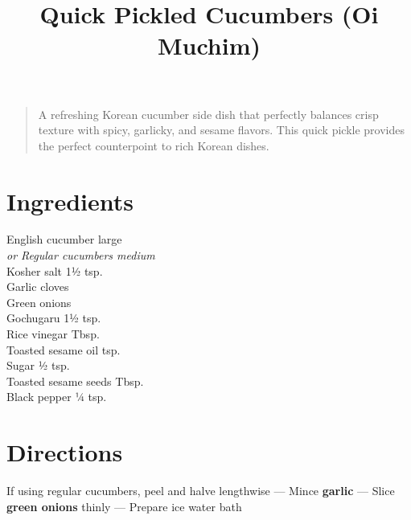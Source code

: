 \documentclass[11pt,letterpaper]{article}
\title{Quick Pickled Cucumbers (Oi Muchim)}
\author{}
\date{}
\begin{document}
\maketitle
\thispagestyle{empty}

\begin{quote}
\small
\begin{em}
A refreshing Korean cucumber side dish that perfectly balances crisp texture with spicy, garlicky, and sesame flavors. This quick pickle provides the perfect counterpoint to rich Korean dishes.
\end{em}
\end{quote}

\section*{Ingredients}
\setlength{\columnsep}{20pt}
\begin{multicols}{2}
\noindent
    English cucumber  large \\
    \textit{or Regular cucumbers  medium }\\
    Kosher salt \dotfill 1½ tsp. \\
    Garlic cloves  \\
    Green onions  \\
    Gochugaru \dotfill 1½ tsp. \\
    \columnbreak
    Rice vinegar  Tbsp. \\
    Toasted sesame oil  tsp. \\
    Sugar \dotfill ½ tsp. \\
    Toasted sesame seeds  Tbsp. \\
    Black pepper \dotfill ¼ tsp. \\
\end{multicols}

\section*{Directions}

\noindent
If using regular cucumbers, peel and halve lengthwise ---
Mince \textbf{garlic} ---
Slice \textbf{green onions} thinly ---
Prepare ice water bath
\end{document}
